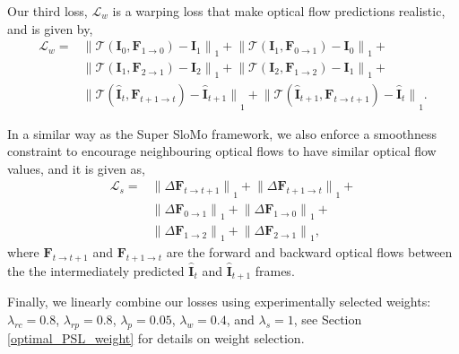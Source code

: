 \documentclass[10pt,twocolumn,letterpaper]{article}
\begin{document}
Our third loss, $\mathcal{L}_{w}$ is a warping loss that make optical flow predictions realistic, and is given by, 
\begin{equation}\label{eq:12}
\begin{split}
\mathcal{L}_{w} = & 
{\lVert\mathcal{T}(\textbf{I}_{0}, \textbf{F}_{1\rightarrow 0})-\textbf{I}_{1}\rVert}_{1} + {\lVert\mathcal{T}(\textbf{I}_{1}, \textbf{F}_{0\rightarrow 1})-\textbf{I}_{0}\rVert}_{1} + \\
& {\lVert\mathcal{T}(\textbf{I}_{1}, \textbf{F}_{2\rightarrow1})-\textbf{I}_{2}\rVert}_{1} + {\lVert\mathcal{T}(\textbf{I}_{2}, \textbf{F}_{1\rightarrow2})-\textbf{I}_{1}\rVert}_{1} + \\
& {\lVert\mathcal{T}(\hat{\textbf{I}}_{t}, \textbf{F}_{t+1\rightarrow t})-\hat{\textbf{I}}_{t+1}\rVert}_{1} + {\lVert\mathcal{T}(\hat{\textbf{I}}_{t+1}, \textbf{F}_{t\rightarrow t+1})-\hat{\textbf{I}}_{t}\rVert}_{1}.
\end{split}
\end{equation}

In a similar way as the Super SloMo framework, we also enforce a smoothness constraint to encourage neighbouring optical flows to have similar optical flow values, and it is given as, 
\begin{equation}\label{eq:13}
\begin{split}
\mathcal{L}_{s} = & {\lVert\Delta\textbf{F}_{t\rightarrow t+1}\rVert}_{1} + {\lVert\Delta\textbf{F}_{t+1\rightarrow t}\rVert}_{1} + \\
& {\lVert\Delta\textbf{F}_{0\rightarrow1}\rVert}_{1} + {\lVert\Delta\textbf{F}_{1\rightarrow0}\rVert}_{1} + \\
& {\lVert\Delta\textbf{F}_{1\rightarrow2}\rVert}_{1} + {\lVert\Delta\textbf{F}_{2\rightarrow1}\rVert}_{1} ,
\end{split}
\end{equation}
where $\textbf{F}_{t\rightarrow t+1}$ and $\textbf{F}_{t+1\rightarrow t}$ are the forward and backward optical flows between the the intermediately predicted $\hat{\textbf{I}}_{t}$ and $\hat{\textbf{I}}_{t+1}$ frames.

Finally, we linearly combine our losses using experimentally selected weights: $\lambda_{rc}=0.8$, $\lambda_{rp}=0.8$, $\lambda_{p} = 0.05$, $\lambda_{w} = 0.4$, and $\lambda_{s}=1$, see Section \ref{optimal_PSL_weight} for details on weight selection. 
\end{document}
